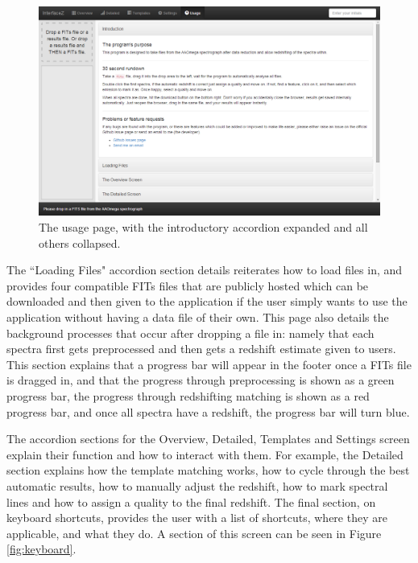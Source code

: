 \documentclass[titlesmallcaps, examinerscopy, copyrightpage]{uqthesis}
\begin{document}
\begin{figure}[ht!]
\includegraphics[width=1\textwidth]{images/usage.png} 
\centering
\caption{The usage page, with the introductory accordion expanded and all others collapsed.}
\label{fig:usage}
\end{figure}


The ``Loading Files" accordion section details reiterates how to load files in, and provides four compatible FITs files that are publicly hosted which can be downloaded and then given to the application if the user simply wants to use the application without having a data file of their own. This page also details the background processes that occur after dropping a file in: namely that each spectra first gets preprocessed and then gets a redshift estimate given to users. This section explains that a progress bar will appear in the footer once a FITs file is dragged in, and that the progress through preprocessing is shown as a green progress bar, the progress through redshifting matching is shown as a red progress bar, and once all spectra have a redshift, the progress bar will turn blue.


The accordion sections for the Overview, Detailed, Templates and Settings screen explain their function and how to interact with them. For example, the Detailed section explains how the template matching works, how to cycle through the best automatic results, how to manually adjust the redshift, how to mark spectral lines and how to assign a quality to the final redshift. The final section, on keyboard shortcuts, provides the user with a list of shortcuts, where they are applicable, and what they do. A section of this screen can be seen in Figure \ref{fig:keyboard}.
\end{document}
